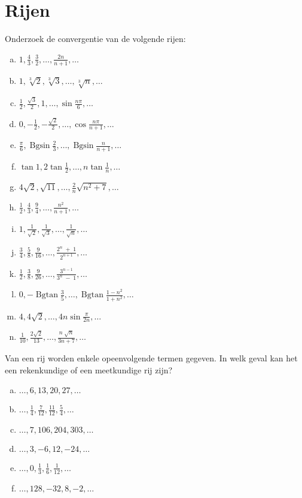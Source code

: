 \documentclass[12pt,twoside]{article}
\DeclareMathOperator*{\Bgsin}{Bgsin}
\DeclareMathOperator*{\Bgtan}{Bgtan}
\begin{document}
\pagestyle{fancy}
\lhead{}

\section{Rijen}

\begin{oefening}
Onderzoek de convergentie van de volgende rijen:
\begin{enumerate}[(a)]
  \item $1, \frac{4}{3}, \frac{3}{2}, \ldots, \frac{2n}{n+1}, \ldots$
  \item $1, \sqrt[3]{2}, \sqrt[3]{3}, \ldots, \sqrt[3]{n}, \ldots$
  \item $\frac{1}{2}, \frac{\sqrt{3}}{2}, 1, \ldots, \sin\frac{n\pi}{6}, \ldots$
  \item $0, -\frac{1}{2}, -\frac{\sqrt{2}}{2}, \ldots, \cos\frac{n\pi}{n+1}, \ldots$
  \item $\frac{\pi}{6}, \Bgsin\frac{2}{3}, \ldots, \Bgsin\frac{n}{n+1}, \ldots$
  \item $\tan 1, 2\tan\frac{1}{2}, \ldots, n\tan\frac{1}{n}, \ldots$
  \item $4\sqrt{2}, \sqrt{11}, \ldots, \frac{2}{n}\sqrt{n^2+7}, \ldots$
  \item $\frac{1}{2}, \frac{4}{3}, \frac{9}{4}, \ldots, \frac{n^2}{n+1}, \ldots$
  \item $1, \frac{1}{\sqrt{2}}, \frac{1}{\sqrt{3}}, \ldots, \frac{1}{\sqrt{n}}, \ldots$
  \item $\frac{3}{4}, \frac{5}{8}, \frac{9}{16}, \ldots, \frac{2^n\;+\; 1}{2^{n+1}}, \ldots$
  \item $\frac{1}{2}, \frac{3}{8}, \frac{9}{26}, \ldots, \frac{3^{n-1}}{3^n\;-\;1}, \ldots$
  \item $0, -\Bgtan\frac{3}{5}, \ldots, \Bgtan\frac{1-n^2}{1+n^2}, \ldots$
  \item $4, 4\sqrt{2}, \ldots, 4n\sin\frac{\pi}{2n}, \ldots$
  \item $\frac{1}{10}, \frac{2\sqrt{2}}{13}, \ldots, \frac{n\;\sqrt{n}}{3n+7}, \ldots$
\end{enumerate}
\end{oefening}

\begin{oefening}
Van een rij worden enkele opeenvolgende termen gegeven. In welk geval kan het een rekenkundige of een meetkundige rij zijn?
\begin{enumerate}[(a)]
  \item $\ldots, 6, 13, 20, 27, \ldots$
  \item $\ldots, \frac{1}{4}, \frac{7}{12}, \frac{11}{12}, \frac{5}{4}, \ldots$
  \item $\ldots, 7, 106, 204, 303, \ldots$
  \item $\ldots, 3, -6, 12, -24, \ldots$
  \item $\ldots, 0, \frac{1}{3}, \frac{1}{6}, \frac{1}{12}, \ldots$
  \item $\ldots, 128, -32, 8, -2, \ldots$
\end{enumerate}
\end{oefening}
\end{document}
